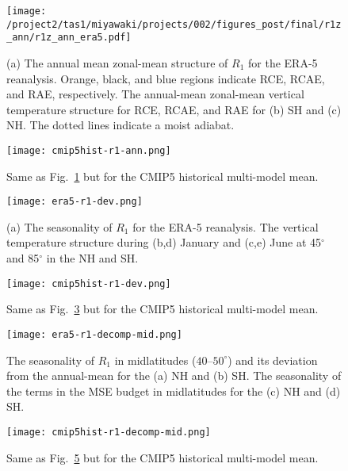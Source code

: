 \documentclass{ametsocV5}
\begin{document}
\begin{figure}[t]
  \noindent\texttt{[image: /project2/tas1/miyawaki/projects/002/figures\_post/final/r1z\_ann/r1z\_ann\_era5.pdf]}\\
  \caption{(a) The annual mean zonal-mean structure of $R_{1}$ for the ERA-5 reanalysis. Orange, black, and blue regions indicate RCE, RCAE, and RAE, respectively. The annual-mean zonal-mean vertical temperature structure for RCE, RCAE, and RAE for (b) SH and (c) NH. The dotted lines indicate a moist adiabat.}
  \label{fig:era5-r1-ann}
\end{figure}

\begin{figure}[t]
  \noindent\texttt{[image: cmip5hist-r1-ann.png]}\\
  \caption{Same as Fig.~\ref{fig:era5-r1-ann} but for the CMIP5 historical multi-model mean.}
  \label{fig:cmip5hist-r1-ann}
\end{figure}

\begin{figure}[t]
  \noindent\texttt{[image: era5-r1-dev.png]}\\
  \caption{(a) The seasonality of $R_{1}$ for the ERA-5 reanalysis. The vertical temperature structure during (b,d) January and (c,e) June at 45$^{\circ}$ and 85$^{\circ}$ in the NH and SH.}
  \label{fig:era5-r1-dev}
\end{figure}

\begin{figure}[t]
  \noindent\texttt{[image: cmip5hist-r1-dev.png]}\\
  \caption{Same as Fig.~\ref{fig:era5-r1-dev} but for the CMIP5 historical multi-model mean.}
  \label{fig:cmip5hist-r1-dev}
\end{figure}

\begin{figure}[t]
  \noindent\texttt{[image: era5-r1-decomp-mid.png]}\\
  \caption{The seasonality of $R_{1}$ in midlatitudes ($40$--$50^{\circ}$) and its deviation from the annual-mean for the (a) NH and (b) SH. The seasonality of the terms in the MSE budget in midlatitudes for the (c) NH and (d) SH.}
  \label{fig:era5-r1-decomp-mid}
\end{figure}

\begin{figure}[t]
  \noindent\texttt{[image: cmip5hist-r1-decomp-mid.png]}\\
  \caption{Same as Fig.~\ref{fig:era5-r1-decomp-mid} but for the CMIP5 historical multi-model mean.}
  \label{fig:cmip5hist-r1-decomp-mid}
\end{figure}
\end{document}
